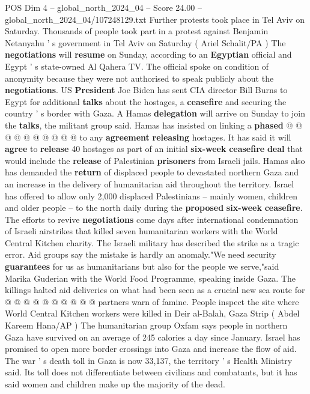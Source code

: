 \begin{textsample}{POS Dim 4 – global\_north\_2024\_04 – Score 24.00 – global\_north\_2024\_04/107248129.txt}
Further protests took place in Tel Aviv on Saturday.
Thousands of people took part in a protest against Benjamin Netanyahu ' s government in Tel Aviv on Saturday ( Ariel Schalit/PA ) The \textbf{negotiations} will \textbf{resume} on Sunday, according to an \textbf{Egyptian} official and Egypt ' s state-owned Al Qahera TV.
The official spoke on condition of anonymity because they were not authorised to speak publicly about the \textbf{negotiations}.
US \textbf{President} Joe Biden has sent CIA director Bill Burns to Egypt for additional \textbf{talks} about the hostages, a \textbf{ceasefire} and securing the country ' s border with Gaza.
A Hamas \textbf{delegation} will arrive on Sunday to join the \textbf{talks}, the militant group said.
Hamas has insisted on linking a \textbf{phased} @ @ @ @ @ @ @ @ @ @ to any \textbf{agreement} \textbf{releasing} hostages.
It has said it will \textbf{agree} to \textbf{release} 40 hostages as part of an initial \textbf{six-week} \textbf{ceasefire} \textbf{deal} that would include the \textbf{release} of Palestinian \textbf{prisoners} from Israeli jails.
Hamas also has demanded the \textbf{return} of displaced people to devastated northern Gaza and an increase in the delivery of humanitarian aid throughout the territory.
Israel has offered to allow only 2,000 displaced Palestinians -- mainly women, children and older people -- to the north daily during the \textbf{proposed} \textbf{six-week} \textbf{ceasefire}.
The efforts to revive \textbf{negotiations} come days after international condemnation of Israeli airstrikes that killed seven humanitarian workers with the World Central Kitchen charity.
The Israeli military has described the strike as a tragic error.
Aid groups say the mistake is hardly an anomaly."We need security \textbf{guarantees} for us as humanitarians but also for the people we serve,"said Marika Guderian with the World Food Programme, speaking inside Gaza.
The killings halted aid deliveries on what had been seen as a crucial new sea route for @ @ @ @ @ @ @ @ @ @ partners warn of famine.
People inspect the site where World Central Kitchen workers were killed in Deir al-Balah, Gaza Strip ( Abdel Kareem Hana/AP ) The humanitarian group Oxfam says people in northern Gaza have survived on an average of 245 calories a day since January.
Israel has promised to open more border crossings into Gaza and increase the flow of aid.
The war ' s death toll in Gaza is now 33,137, the territory ' s Health Ministry said.
Its toll does not differentiate between civilians and combatants, but it has said women and children make up the majority of the dead.

\end{textsample}
